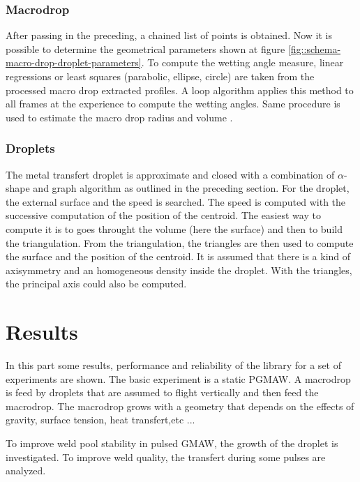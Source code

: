 \documentclass[12pt]{iopart}
\begin{document}
\subsubsection{Macrodrop}
\label{macrodrop}

After passing in the preceding, a chained list of points is obtained.
Now it is possible to determine the geometrical parameters shown 
at figure \ref{fig::schema-macro-drop-droplet-parameters}. To compute the wetting 
angle measure, linear regressions or least squares (parabolic, ellipse, circle) 
are taken from the processed macro drop extracted profiles.
A loop algorithm applies this method to all frames at the experience to compute the wetting 
angles. Same procedure is used to estimate the macro drop radius and volume \cite{CHAPUIS}.

\subsubsection{Droplets}
\label{droplets}

The metal transfert droplet is approximate and closed with a combination of $\alpha$-shape and
graph algorithm as outlined in the preceding section.
For the droplet, the external surface and the speed is searched.
The speed is computed with the successive computation of the position of the centroid.
The easiest way to compute it is to goes throught the volume (here the surface) and then
to build the triangulation. From the triangulation, the triangles 
are then used to compute the surface and the position of the centroid. It is assumed that there is a kind
of axisymmetry  and an homogeneous density inside the droplet. With the triangles, the principal axis could also be 
computed.


\section{ Results}
\label{results}

In this part some results, performance and reliability of the library for a set of experiments
are shown. The basic experiment is a static PGMAW.
A macrodrop is feed by droplets that are assumed to flight vertically and
then feed the macrodrop. The macrodrop grows with a geometry that depends on the effects of gravity,
surface tension, heat transfert,etc ...

To improve weld pool stability in pulsed GMAW, the growth of the droplet is investigated.
To improve weld quality, the transfert during some pulses are analyzed.
\end{document}
